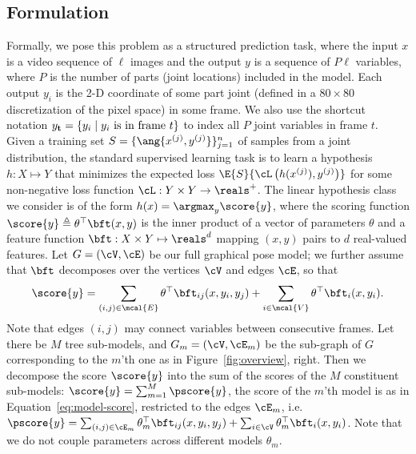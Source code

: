 \subsection{Formulation}
Formally, we pose this problem as a structured prediction task, where
the input $x$ is a video sequence of $\ell$ images and the output $y$ is a
sequence of $P\ell$ variables, where $P$ is the number of parts (joint
locations) included in the model. Each output $y_i$ is the 2-D
coordinate of some part joint (defined in a $80 \times 80$
discretization of the pixel space) in some frame.  We also use the shortcut notation 
$y_{\bf t} = \{ y_i \;|\; y_i \text{ is in frame } t \}$
to index all $P$ joint variables in frame $t$. Given a training set
$S = \{\ang{x^{(j)},y^{(j)}}\}_{j=1}^n$ of samples from a joint
distribution, the standard supervised learning task is to learn a
hypothesis $h: X \mapsto Y$ that minimizes the expected loss $\E{S}{
  \cL\left(h(x^{(j)}) , y^{(j)}\right)}$ for some non-negative loss function $\cL
: Y \times Y \rightarrow \reals^+$. The linear hypothesis class we
consider is of the form $h(x) = \argmax_y \score{y}$, where the
scoring function $\score{y} \triangleq \theta^\top \bft(x,y)$ is the
inner product of a vector of parameters $\theta$ and a feature
function $\bft: X \times Y \mapsto \reals^d$ mapping $(x,y)$ pairs to
$d$ real-valued features. Let $G = (\cV,\cE)$ be our full graphical
pose model; we further assume that $\bft$ decomposes over the vertices
$\cV$ and edges $\cE$, so that
\begin{equation}
  \label{eq:model-score}
  \score{y} = \sum_{(i,j) \in \mcal{E}}\theta^\top\bft_{ij}(x,y_i,y_j) +
  \sum_{i \in \mcal{V}}\theta^\top\bft_i(x,y_i).
\end{equation}
Note that edges $(i,j)$ may connect variables between consecutive
frames. Let there be $M$ tree sub-models, and $G_m = (\cV, \cE_m)$ be the sub-graph of $G$ corresponding
to the $m$'th one as in Figure~\ref{fig:overview}, right.  Then
we decompose the score $\score{y}$ into the sum of the scores of the
$M$ constituent sub-models: $\score{y} = \sum_{m=1}^M \pscore{y}$, the
score of the $m$'th model is as in Equation~\ref{eq:model-score}, restricted to the
edges $\cE_m$, i.e. $\pscore{y} =
\sum_{(i,j)\in\cE_m}\theta_m^\top\bft_{ij}(x,y_i,y_j) +
\sum_{i\in\cV}\theta_m^\top\bft_i(x,y_i)$. Note that we do not couple
parameters across different models $\theta_m$.


